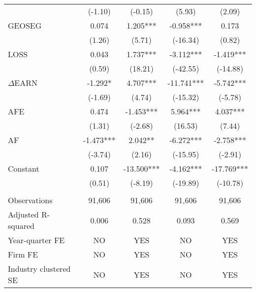 \begin{table}[htbp]
\begin{tabular}{lcccc}
      & (-1.10) & (-0.15) & (5.93) & (2.09) \\
    GEOSEG & 0.074 & 1.205*** & -0.958*** & 0.173 \\
      & (1.26) & (5.71) & (-16.34) & (0.82) \\
    LOSS & 0.043 & 1.737*** & -3.112*** & -1.419*** \\
      & (0.59) & (18.21) & (-42.55) & (-14.88) \\
    $\Delta$EARN & -1.292* & 4.707*** & -11.741*** & -5.742*** \\
      & (-1.69) & (4.74) & (-15.32) & (-5.78) \\
    AFE & 0.474 & -1.453*** & 5.964*** & 4.037*** \\
      & (1.31) & (-2.68) & (16.53) & (7.44) \\
    AF & -1.473*** & 2.042** & -6.272*** & -2.758*** \\
      & (-3.74) & (2.16) & (-15.95) & (-2.91) \\
    Constant & 0.107 & -13.500*** & -4.162*** & -17.769*** \\
      & (0.51) & (-8.19) & (-19.89) & (-10.78) \\
      &   &   &   &  \\
    Observations & 91,606 & 91,606 & 91,606 & 91,606 \\
    Adjusted R-squared & 0.006 & 0.528 & 0.093 & 0.569 \\
    Year-quarter FE & NO & YES & NO & YES \\
    Firm FE & NO & YES & NO & YES \\
    Industry clustered SE & NO & YES & NO & YES \\
    \bottomrule
    \end{tabular}%
\end{table}%
